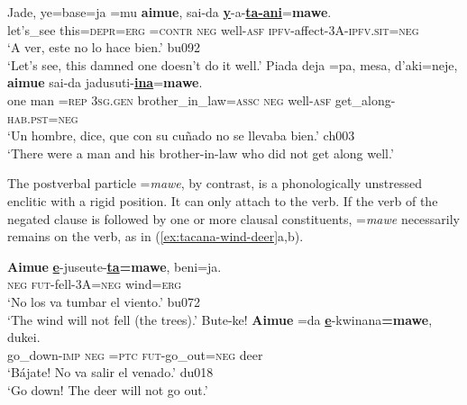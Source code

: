 \documentclass[output=paper]{langsci/langscibook}
\begin{document}
\begin{exe}\ex\label{ex:tacana-damned-inlaws}      
\begin{xlist}
\ex\label{ex:tacana-damned}
\gll  Jade,  ye=base=ja{\cb}  =mu  \textbf{aimue},  sai-da
  \textbf{\underline{y}}-a-\textbf{\underline{ta-ani}}=\textbf{mawe}.\\
    let's\_see  this=\textsc{depr}=\textsc{erg}  \textsc{=contr}
    \textsc{neg}  well-\textsc{asf}
    \textsc{ipfv-}affect-3A-\textsc{ipfv.sit=neg}\\
\glt `A ver, este no lo hace bien.' bu092\\
`Let's see, this damned one doesn't do it well.'
\ex\label{ex:tacana-inlaws}
\gll {}Piada deja{\cb} =pa,
{\ob}mesa,  d'aki=neje{\cb},  \textbf{aimue} sai-da
jadusuti-\textbf{\underline{ina}}=\textbf{mawe}.\\
one  man  =\textsc{rep}  \textsc{3sg.gen}
    brother\_in\_law=\textsc{assc}  \textsc{neg}  well-\textsc{asf}
    get\_along-\textsc{hab.pst=neg}\\
\glt `Un hombre, dice, que con su cuñado no se llevaba bien.' ch003\\
`There were a man and his brother-in-law who did not get along well.'
\end{xlist}\end{exe}
%
The postverbal particle =\textit{mawe}, by contrast, is a phonologically
unstressed enclitic with a rigid position. It can only attach to the verb.
If the verb of the negated clause is followed by one or more clausal
constituents, =\textit{mawe} necessarily remains on the verb, as in
(\ref{ex:tacana-wind-deer}a,b).
%
\begin{exe}\ex
\label{ex:tacana-wind-deer}      
\begin{xlist}
\ex\label{ex:tacana-wind}
\gll \textbf{Aimue}
\textbf{\underline{e}}-juseute-\textbf{\underline{ta}=}\textbf{mawe},
beni=ja.\\
    \textsc{neg}  \textsc{fut}-fell-3A=\textsc{neg}  wind=\textsc{erg}\\
\glt `No los va tumbar el viento.' bu072\\
`The wind will not fell (the trees).'
\ex\label{ex:tacana-deer}          
\gll  Bute-ke!  \textbf{Aimue}  =da
\textbf{\underline{e}}-kwinana\textbf{=mawe},
dukei.\\
    go\_down-\textsc{imp}  \textsc{neg}  \textsc{=ptc}
    \textsc{fut}-go\_out=\textsc{neg}  deer\\
\glt `Bájate! No va salir el venado.' du018\\
`Go down! The deer will not go out.'
\end{xlist}\end{exe}
\end{document}
